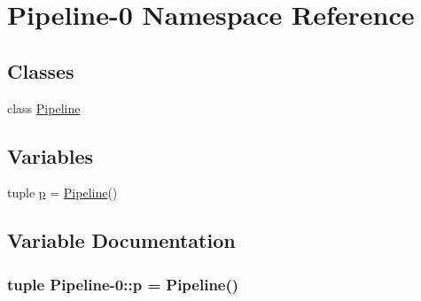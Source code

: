 \hypertarget{namespace_pipeline-0}{\section{\-Pipeline-\/0 \-Namespace \-Reference}
\label{namespace_pipeline-0}
}
\subsection*{\-Classes}
\begin{DoxyCompactItemize}
\item 
class \hyperlink{class_pipeline-0_1_1_pipeline}{\-Pipeline}
\end{DoxyCompactItemize}
\subsection*{\-Variables}
\begin{DoxyCompactItemize}
\item 
tuple \hyperlink{namespace_pipeline-0_a529a25d172d317ee7944da35198cd9c8}{p} = \hyperlink{class_pipeline-0_1_1_pipeline}{\-Pipeline}()
\end{DoxyCompactItemize}


\subsection{\-Variable \-Documentation}
\hypertarget{namespace_pipeline-0_a529a25d172d317ee7944da35198cd9c8}{
\subsubsection[{p}]{\setlength{\rightskip}{0pt plus 5cm}tuple {\bf \-Pipeline}-\/0\-::{\bf p} = {\bf \-Pipeline}()}}\label{namespace_pipeline-0_a529a25d172d317ee7944da35198cd9c8}
